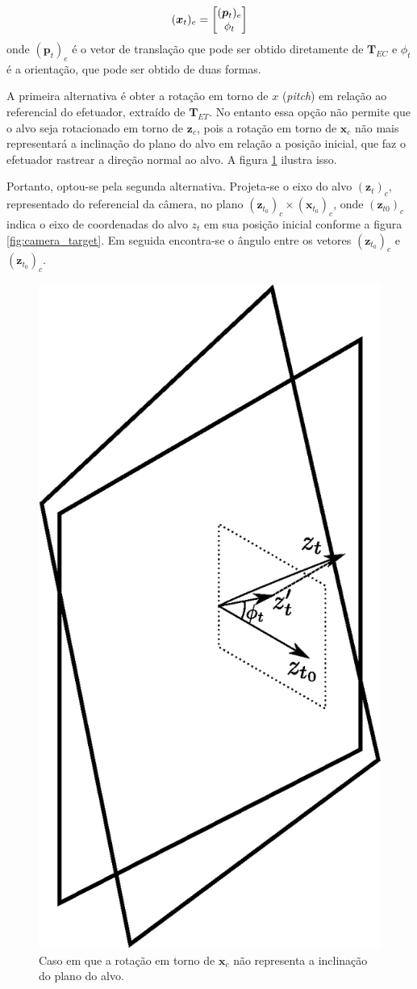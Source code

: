 \begin{equation}
(\bm{x}_t)_e = \begin{bmatrix} (\bm{p}_t)_e \\ \phi_t \end{bmatrix}
\end{equation}
onde $(\bm{p}_t)_e$ é o vetor de translação que pode ser obtido diretamente de $\bm{T}_{EC}$ e  $\phi_t$ é a orientação, que pode ser obtido de duas formas.

A primeira alternativa é obter a rotação em torno de $x$ (\textit{pitch}) em relação ao referencial do efetuador, extraído de $\bm{T}_{ET}$. No entanto essa opção não permite que o alvo seja rotacionado em torno de $\bm{z}_c$, pois a rotação em torno de $\bm{x}_c$ não mais representará a inclinação do plano do alvo em relação a posição inicial, que faz o efetuador rastrear a direção normal ao alvo. A figura \ref{fig:projection} ilustra isso. 

Portanto, optou-se pela segunda alternativa. Projeta-se o eixo do alvo $(\bm{z}_t)_c$, representado do referencial da câmera, no plano $(\bm{z}_{t_0})_c \times (\bm{x}_{t_0})_c$, onde $(\bm{z}_{t0})_c$ indica o eixo de coordenadas do alvo $z_t$ em sua posição inicial conforme a figura \ref{fig:camera_target}. Em seguida encontra-se o ângulo entre os vetores $(\bm{z}_{t_0})_c$ e $(\bm{z}_{t_0})_c$. 

\begin{figure}[!ht]
\centering
  \includegraphics[width=0.3\linewidth]{./img/projection.eps}
  \caption{Caso em que a rotação em torno de $\bm{x}_c$ não representa a inclinação do plano do alvo.}
  \label{fig:projection}
\end{figure}%



